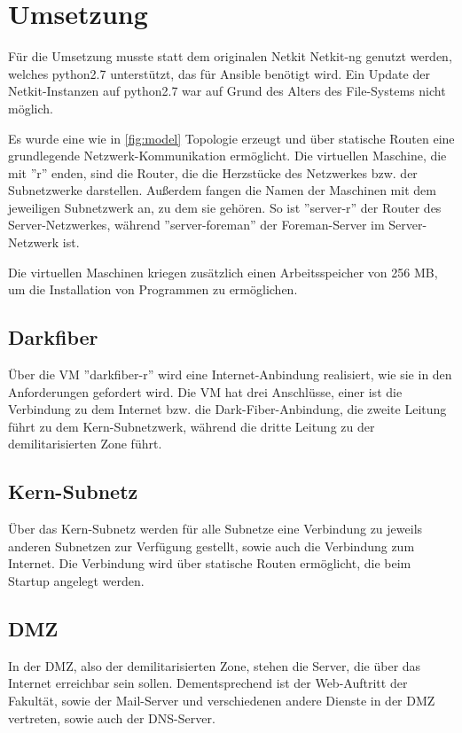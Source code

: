 \chapter{Umsetzung}

Für die Umsetzung musste statt dem originalen Netkit Netkit-ng genutzt werden, welches python2.7 unterstützt, das für Ansible benötigt wird. Ein Update der Netkit-Instanzen auf python2.7 war auf Grund des Alters des File-Systems nicht möglich.

Es wurde eine wie in \ref{fig:model} Topologie erzeugt und über statische Routen eine grundlegende Netzwerk-Kommunikation ermöglicht. Die virtuellen Maschine, die mit ''r'' enden, sind die Router, die die Herzstücke des Netzwerkes bzw. der Subnetzwerke darstellen. Außerdem fangen die Namen der Maschinen mit dem jeweiligen Subnetzwerk an, zu dem sie gehören. So ist ''server-r'' der Router des Server-Netzwerkes, während ''server-foreman'' der Foreman-Server im Server-Netzwerk ist.

Die virtuellen Maschinen kriegen zusätzlich einen Arbeitsspeicher von 256 MB, um die Installation von Programmen zu ermöglichen.

\section{Darkfiber}
Über die VM ''darkfiber-r'' wird eine Internet-Anbindung realisiert, wie sie in den Anforderungen gefordert wird. Die VM hat drei Anschlüsse, einer ist die Verbindung zu dem Internet bzw. die Dark-Fiber-Anbindung, die zweite Leitung führt zu dem Kern-Subnetzwerk, während die dritte Leitung zu der demilitarisierten Zone führt.

\section{Kern-Subnetz}
Über das Kern-Subnetz werden für alle Subnetze eine Verbindung zu jeweils anderen Subnetzen zur Verfügung gestellt, sowie auch die Verbindung zum Internet. Die Verbindung wird über statische Routen ermöglicht, die beim Startup angelegt werden.

\section{DMZ}
In der DMZ, also der demilitarisierten Zone, stehen die Server, die über das Internet erreichbar sein sollen. Dementsprechend ist der Web-Auftritt der Fakultät, sowie der Mail-Server und verschiedenen andere Dienste in der DMZ vertreten, sowie auch der DNS-Server.

